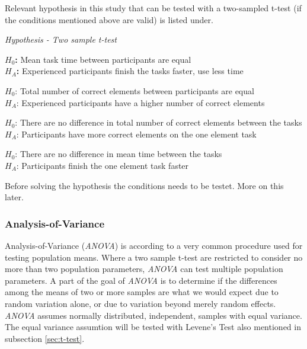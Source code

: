Relevant hypothesis in this study that can be tested with a two-sampled t-test (if the conditions mentioned above are valid) is listed under. \newline

\begin{framed}{\noindent\centering
		
		\textit{Hypothesis - Two sample t-test} \newline
		
		\textbf{$H_{0}$:} Mean task time between participants are equal\\
		\textbf{$H_{A}$:} Experienced participants finish the tasks faster, use less time\newline
		
		$H_{0}$: Total number of correct elements between participants are equal \\
		$H_{A}$: Experienced participants have a higher number of correct elements\newline
		
		$H_{0}$: There are no difference in total number of correct elements between the tasks\\
		$H_{A}$: Participants have more correct elements on the one element task\newline
		
		$H_{0}$: There are no difference in mean time between the tasks\\    
		$H_{A}$: Participants finish the one element task faster  %
		\par}
\end{framed}

Before solving the hypothesis the conditions needs to be testet. More on this later. %

\subsubsection[ANOVA]{Analysis-of-Variance}\label{sec:anova}
Analysis-of-Variance (\textit{ANOVA}) is according to \cite{Walpole2012} a very common procedure used for testing population means. Where a two sample t-test are restricted to consider no more than two population parameters, \textit{ANOVA} can test multiple population parameters. A part of the goal of \textit{ANOVA} is to determine if the differences among the means of two or more samples are what we would expect due to random variation alone, or due to variation beyond merely random effects. \textit{ANOVA} assumes normally distributed, independent, samples with equal variance. The equal variance assumtion will be tested with Levene's Test also mentioned in subsection \ref{sec:t-test}. 

